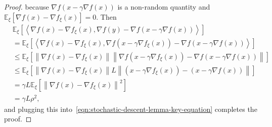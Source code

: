 \documentclass[10pt,a4paper]{amsart}
\newcommand{\inprod}[2]{\left\langle #1,#2 \right\rangle}
\newcommand{\norm}[1]{\left\|#1\right\|}
\newcommand{\sqnorm}[1]{\left\| #1 \right\|^2}
\begin{document}
\begin{proof}
because $\nabla f(x-\gamma\nabla f(x))$ is a non-random quantity and $\mathbb{E}_\xi [\nabla f(x) - \nabla f_\xi(x)] = 0$.
Then
\begin{align*}
    & \mathbb{E}_\xi \left[ \inprod{\nabla f(x) - \nabla f_\xi(x)}{\nabla f(y) - \nabla f(x - \gamma\nabla f(x))} \right] \\
    & = \mathbb{E}_\xi \left[ \inprod{\nabla f(x) - \nabla f_\xi(x)}{\nabla f(x - \gamma\nabla f_\xi(x)) - \nabla f(x - \gamma\nabla f(x))} \right] \\
    & \le \mathbb{E}_\xi \left[ \norm{\nabla f(x) - \nabla f_\xi(x)} \norm{\nabla f(x - \gamma\nabla f_\xi(x)) - \nabla f(x - \gamma\nabla f(x))} \right] \\
    & \le \mathbb{E}_\xi \left[ \norm{\nabla f(x) - \nabla f_\xi(x)} L \norm{(x - \gamma\nabla f_\xi(x)) - (x - \gamma\nabla f(x))} \right] \\
    & = \gamma L \mathbb{E}_\xi \left[ \sqnorm{\nabla f(x) - \nabla f_\xi(x)} \right] \\
    & = \gamma L \rho^2 ,
\end{align*}
and plugging this into~\eqref{eqn:stochastic-descent-lemma-key-equation} completes the proof.

\end{proof}
\end{document}
